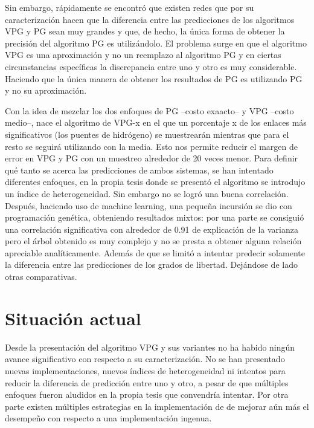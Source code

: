 Sin embargo, rápidamente se encontró que existen redes que por su caracterización hacen que la diferencia entre las predicciones de los algoritmos VPG y PG sean muy grandes y que, de hecho, la única forma de obtener la precisión del algoritmo PG es utilizándolo\parencite{Gonzalez2011}. El problema surge en que el algoritmo VPG es una aproximación y no un reemplazo al algoritmo PG y en ciertas circunstancias específicas la discrepancia entre uno y otro es muy considerable. Haciendo que  la única manera de obtener los resultados de PG es utilizando PG y no su aproximación.

Con la idea de mezclar los dos enfoques de PG --costo exaacto-- y VPG --costo medio--,  nace el algoritmo de VPG-x\parencite{Gonzalez2011} en el que un porcentaje x de los enlaces más significativos (los puentes de hidrógeno) se muestrearán mientras que para el resto se seguirá utilizando con la media. Esto nos permite reducir el margen de error en VPG y PG con un muestreo alrededor de 20 veces menor.
Para definir qué tanto se acerca las predicciones de ambos sistemas, se han intentado diferentes enfoques, en la propia tesis donde se presentó el algoritmo se introdujo un índice de heterogeneidad\parencite{Gonzalez2011}. Sin embargo no se logró una buena correlación. Después, haciendo uso de machine learning, una pequeña incursión se dio con programación genética\parencite{Chacon2014}, obteniendo resultados mixtos: por una parte se consiguió una correlación significativa con alrededor de 0.91 de explicación de la varianza pero el árbol obtenido es muy complejo y no se presta a obtener alguna relación apreciable analíticamente. Además de que se limitó a intentar predecir solamente la diferencia entre las predicciones de los grados de libertad. Dejándose de lado otras comparativas.

\section{Situación actual}
Desde la presentación del algoritmo VPG y sus variantes no ha habido ningún avance significativo con respecto a su caracterización. No se han presentado nuevas implementaciones, nuevos índices de heterogeneidad ni intentos para reducir la diferencia de predicción entre uno y otro, a pesar de que múltiples enfoques fueron aludidos en la propia tesis que convendría intentar. Por otra parte existen múltiples estrategias en la implementación de de mejorar aún más el desempeño con respecto a una implementación ingenua.

